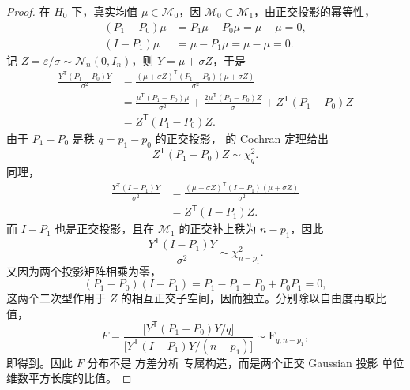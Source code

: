 \begin{proof}
在 $H_0$ 下，真实均值 $\mu\in\mathcal M_0$，因 $\mathcal M_0\subset\mathcal M_1$，由正交投影的幂等性，
\begin{align*}
(P_1-P_0)\mu&=P_1\mu-P_0\mu=\mu-\mu=0,\\
(I-P_1)\mu&=\mu-P_1\mu=\mu-\mu=0.
\end{align*}
记 $Z=\varepsilon/\sigma\sim\mathcal N_n(0,I_n)$，则 $Y=\mu+\sigma Z$，于是
\begin{align*}
\frac{Y^{\mathsf T}(P_1-P_0)Y}{\sigma^2}
&=\frac{(\mu+\sigma Z)^{\mathsf T}(P_1-P_0)(\mu+\sigma Z)}{\sigma^2}\\
&=\frac{\mu^{\mathsf T}(P_1-P_0)\mu}{\sigma^2}
+\frac{2\mu^{\mathsf T}(P_1-P_0)Z}{\sigma}
+Z^{\mathsf T}(P_1-P_0)Z\\
&=Z^{\mathsf T}(P_1-P_0)Z.
\end{align*}
由于 $P_1-P_0$ 是秩 $q=p_1-p_0$ 的正交投影， 的 Cochran 定理给出
\begin{equation*}
Z^{\mathsf T}(P_1-P_0)Z\sim\chi^2_q.
\end{equation*}
同理，
\begin{align*}
\frac{Y^{\mathsf T}(I-P_1)Y}{\sigma^2}
&=\frac{(\mu+\sigma Z)^{\mathsf T}(I-P_1)(\mu+\sigma Z)}{\sigma^2}\\
&=Z^{\mathsf T}(I-P_1)Z.
\end{align*}
而 $I-P_1$ 也是正交投影，且在 $\mathcal M_1$ 的正交补上秩为 $n-p_1$，因此
\begin{equation*}
\frac{Y^{\mathsf T}(I-P_1)Y}{\sigma^2}
\sim\chi^2_{n-p_1}.
\end{equation*}
又因为两个投影矩阵相乘为零，
\begin{equation*}
(P_1-P_0)(I-P_1)=P_1-P_1-P_0+P_0P_1=0,
\end{equation*}
这两个二次型作用于 $Z$ 的相互正交子空间，因而独立。分别除以自由度再取比值，
\begin{equation*}
F=\frac{\bigl[Y^{\mathsf T}(P_1-P_0)Y/q\bigr]}{\bigl[Y^{\mathsf T}(I-P_1)Y/(n-p_1)\bigr]}
\sim\mathrm F_{q,n-p_1},
\end{equation*}
即得到。因此 $F$ 分布不是 方差分析 专属构造，而是两个正交 Gaussian 投影 单位维数平方长度的比值。
\end{proof}

